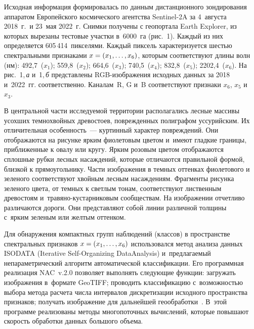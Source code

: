 \begin{multicols}{2}
  
  Исходная информация формировалась по данным дистанционного 
зондирования аппаратом Европейского космического агентства Sentinel-2A за 
4~августа 2018~г.\ и 23~мая 2022~г. Сним\-ки получены с геопортала Earth 
Explorer, из которых вырезаны тестовые участки в~6000~га (рис.~1). 
Каждый из них определяется 605\,414~пикселями. Каждый пиксель 
характеризуется шестью спектральными признаками $x\hm= (x_1, \ldots , x_6)$, 
которым соответствуют длины волн (нм): 492,7~($x_1$); 559,8~($x_2$); 
664,6~($x_3$); 740,5~($x_4$); 832,8~($x_5$); 2202,4~($x_6$). На рис.~1,\,\textit{а} 
и~1,\,\textit{б} представлены RGB-изоб\-ра\-же\-ния исходных данных за 2018 
и~2022~гг. соответственно. Каналам~R, G и~B соответствуют признаки $x_6$, 
$x_5$ и~$x_3$.
  


  
  В центральной части исследуемой территории располагались лесные 
массивы усохших темнохвойных древостоев, поврежденных полиграфом 
уссурийским. Их отличительная особенность~--- куртинный характер 
повреждений. Они отображаются на рисунке ярким фиолетовым цветом 
и~имеют гладкие границы, приближенные к овалу или кругу. Ярким розовым 
цветом отображаются сплош\-ные руб\-ки лесных насаждений, которые 
отличаются правильной формой, близкой к прямоугольнику. Части 
изображения в темных оттенках фиолетового и зеленого соответствуют 
хвойным лесным насаждениям. Фрагменты рисунка зеленого цвета, от темных 
к светлым тонам, соответствуют лиственным древостоям  
и~тра\-вя\-но-кус\-тар\-ни\-ко\-вым сообществам. На изображении отчетливо 
различаются дороги. Они представляют собой линии различной толщины 
с~ярким зеленым или желтым оттенком.
  
  Для обнаружения компактных групп наблюдений (классов) в пространстве 
спектральных признаков $x\hm= (x_1,\ldots , x_6)$ использовался метод анализа 
данных ISODATA (Iterative Self-Organizing Data\linebreak Analysis) и~пред\-ла\-га\-емый не\-па\-ра\-мет\-ри\-че\-ский алгоритм 
автоматической классификации. Его программная реализация NAC~v.2.0 
поз\-во\-ля\-ет выполнять сле\-ду\-ющие функции: за\-гру\-жать \mbox{изоб\-ра\-же\-ния} в~формате 
GeoTIFF; проводить классификацию с~воз\-мож\-ностью выбора метода расчета 
чис\-ла интервалов дискретизации исходного пространства признаков; получать 
изобра\-же\-ние для дальнейшей гео\-об\-ра\-бо\-тки~\cite{16-l}. В~этой программе 
реализованы методы многопоточных вы\-чис\-ле\-ний, которые повышают ско\-рость 
обработки данных большого объема.


\end{multicols}
